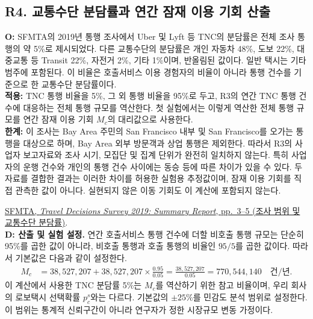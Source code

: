 \documentclass[10pt,a4paper]{article}
\begin{document}
\subsection*{\hypertarget{rationale-R4}{R4. 교통수단 분담률과 연간 잠재 이용 기회 산출}}
\noindent
\textbf{O:}
SFMTA의 2019년 통행 조사에서 Uber 및 Lyft 등
TNC의 분담률은 전체 조사 통행의 약 5\%로 제시되었다.
다른 교통수단의 분담률은 개인 자동차 48\%,
도보 22\%, 대중교통 등 Transit 22\%,
자전거 2\%, 기타 1\%이며, 반올림된 값이다.
일반 택시는 기타 범주에 포함된다.
이 비율은 호출서비스 이용 경험자의 비율이 아니라
통행 건수를 기준으로 한 교통수단 분담률이다.\\
\textbf{적용:}
TNC 통행 비율을 5\%, 그 외 통행 비율을 95\%로 두고,
R3의 연간 TNC 통행 건수에 대응하는
전체 통행 규모를 역산한다.
첫 실험에서는 이렇게 역산한 전체 통행 규모를
연간 잠재 이용 기회 $M_c$의 대리값으로 사용한다.\\
\textbf{한계:}
이 조사는 Bay Area 주민의 San Francisco 내부 및
San Francisco를 오가는 통행을 대상으로 하며,
Bay Area 외부 방문객과 상업 통행은 제외한다.
따라서 R3의 사업자 보고자료와 조사 시기,
모집단 및 집계 단위가 완전히 일치하지 않는다.
특히 사업자의 운행 건수와 개인의 통행 건수 사이에는
동승 등에 따른 차이가 있을 수 있다.
두 자료를 결합한 결과는 이러한 차이를 허용한
실험용 추정값이며, 잠재 이용 기회를 직접 관측한 값이 아니다.
실현되지 않은 이동 기회도 이 계산에 포함되지 않는다.
\par \href{https://www.sfmta.com/media/20810/download?inline=}
{SFMTA, \textit{Travel Decisions Survey 2019:
Summary Report}, pp.~3--5
(조사 범위 및 교통수단 분담률)}. 
\medskip \\
\textbf{D: 산출 및 실험 설정.}
연간 호출서비스 통행 건수에 더할 비호출 통행 규모는
단순히 95\%를 곱한 값이 아니라,
비호출 통행과 호출 통행의 비율인 $95/5$를 곱한 값이다.
따라서 기본값은 다음과 같이 설정한다.
\[
\begin{aligned}
M_c
&=38{,}527{,}207
  +38{,}527{,}207\times\frac{0.95}{0.05}
=\frac{38{,}527{,}207}{0.05} =770{,}544{,}140
\quad \text{건/년}.
\end{aligned}
\]
이 계산에서 사용한 TNC 분담률 5\%는
$M_c$를 역산하기 위한 참고 비율이며,
우리 회사의 로보택시 선택확률 $p_c^s$와는 다르다.
기본값의 $\pm25\%$를 민감도 분석 범위로 설정한다.
이 범위는 통계적 신뢰구간이 아니라 연구자가 정한
시장규모 변동 가정이다.
\end{document}
